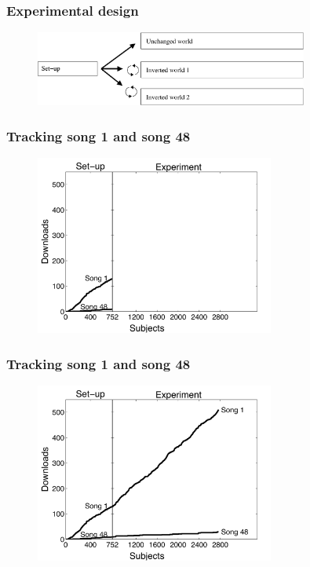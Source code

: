 \documentclass[aspectratio=169]{beamer}
\begin{document}
\begin{frame}
\frametitle{Experimental design}

\begin{figure}
  \centering
  \includegraphics[width=0.8\textwidth]{figures/exp34_asaslides}
\end{figure}

\end{frame}
\begin{frame}
\frametitle{Tracking song 1 and song 48}

\begin{figure}
  \centering
  \includegraphics[width=0.7\textwidth]{figures/pair1_34_asa1}
\end{figure}

\end{frame}
\begin{frame}
\frametitle{Tracking song 1 and song 48}

\begin{figure}
  \centering
  \includegraphics[width=0.7\textwidth]{figures/pair1_34_asa2}
\end{figure}

\end{frame}
\end{document}
